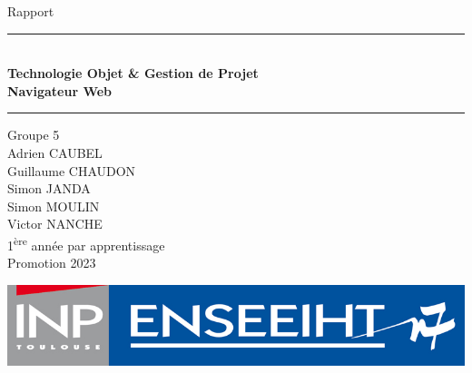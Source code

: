 \newcommand{\ts}{\textsuperscript}

	\begin{center}
		\vspace*{3cm}
		
		{{\fontsize{50}{60}\selectfont Rapport}} \\
		\vspace*{2cm}
		
		\rule{1\textwidth}{1pt} \\
		\vspace*{0.5cm}
		\textbf{\huge{Technologie Objet \& Gestion de Projet}} \\
		\vspace*{0.3cm}
		\textbf{\huge{Navigateur Web}} \\
		\rule{0.75\textwidth}{2pt}
		
		\vspace*{2cm}
		
		\Large{Groupe 5 \\}
		\vspace*{0.3cm}
		\Large{Adrien CAUBEL \\ Guillaume CHAUDON\\ Simon JANDA \\ Simon MOULIN \\ Victor NANCHE } \\
		\vspace*{2cm}
		\large{1\ts{ère} année par apprentissage} \\
		\large{Promotion 2023}
		
		\vspace*{\fill}
		
		\includegraphics[scale=0.2]{inp-enseeiht.jpg}
	\end{center}
